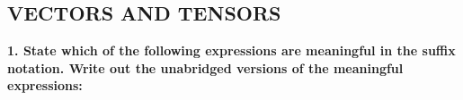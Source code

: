\documentclass[a4paper,12pt]{article}
\begin{document}

\thispagestyle{empty} %
\clearpage


\setcounter{page}{1}

\begin{center}
\section*{\MakeUppercase{Vectors and Tensors}}
\end{center}


\textbf{1. State which of the following expressions are meaningful in the suffix notation. Write out the unabridged versions of the meaningful expressions:}\\
\end{document}
